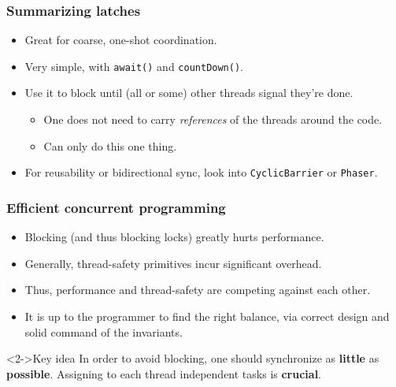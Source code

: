 \documentclass[xcolor={dvipsnames,svgnames},aspectratio=169]{beamer}
\begin{document}
\begin{frame}[fragile]
  \frametitle{Summarizing latches}

  \begin{itemize}
  \item[\faBook]<1-> Great for coarse, one-shot coordination.
  \item[\faBook]<1-> Very simple, with \texttt{await()} and \texttt{countDown()}.
  \item[\faBook]<1-> Use it to block until (all or some) other threads signal
    they’re done.
    \begin{itemize}
      \item[\faCheck] One does not need to carry \emph{references} of the
        threads around the code.
      \item[\faWindowClose] Can only do this one thing.
    \end{itemize}
  \item[\faBook]<2-> For reusability or bidirectional sync, look into
    \texttt{CyclicBarrier} or \texttt{Phaser}.
  \end{itemize}

\end{frame}

\begin{frame}[fragile]
  \frametitle{Efficient concurrent programming}

  \begin{itemize}
  \item[\faUserInjured]<1-> Blocking (and thus blocking locks) greatly hurts
    performance.
  \item[\faBook]<1-> Generally, thread-safety primitives incur significant
    overhead.
  \item[\faBook]<1-> Thus, performance and thread-safety are competing against
    each other.
  \item[\faBook]<1-> It is up to the programmer to find the right balance, via
    correct design and solid command of the invariants.
  \end{itemize}

  \vspace{0.4cm}
  \begin{block}<2->{\faLightbulb \quad Key idea}
    In order to avoid blocking, one should synchronize as \textbf{little} as
    \textbf{possible}.
    Assigning to each thread independent tasks is \textbf{crucial}.
  \end{block}
\end{frame}
\end{document}
